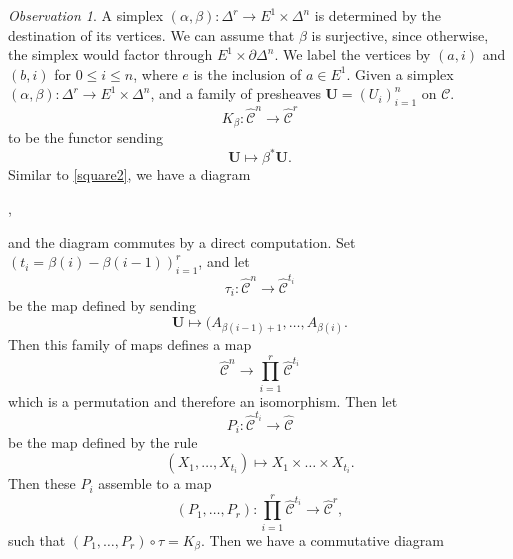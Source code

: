 \documentclass[leqno]{article}
\numberwithin{equation}{subsection}
\theoremstyle{plain}   %
\theoremstyle{remark}
\newtheorem{obs}[equation]{Observation}
\theoremstyle{plain}
\DeclareMathOperator{\id}{id}
\newcommand{\overcat}[2]{{\left(#1\downarrow #2\right)}}
\newcommand{\psh}[1]{\ensuremath{\widehat{#1}}}
\renewcommand{\C}{\ensuremath{\mathcal{C}}}
\newcommand{\ssetlab}{\ensuremath{\widehat{\Delta} \int \widehat{\mathcal{C}}}}
\begin{document}
\begin{obs}\label{joyalsquare2}
	A simplex \((\alpha,\beta):\Delta^r \to E^1\times \Delta^n\) is determined by the destination of its vertices. We can assume that \(\beta\) is surjective, since otherwise, the simplex would factor through \(E^1\times \partial \Delta^n\).     We label the vertices by \((a,i)\) and \((b,i)\) for \(0\leq i \leq n\), where \(e\) is the inclusion of \(a \in E^1\).  Given a simplex \((\alpha,\beta):\Delta^r\to E^1\times \Delta^n\), and a family of presheaves \(\mathbf{U}=(U_i)_{i=1}^n\) on \(\C\). 
	\[K_{\beta}:\psh{\C}^n \to \psh{\C}^r\]
	to be the functor sending
	\[\mathbf{U} \mapsto \beta^\ast \mathbf{U}.\]
	Similar to \ref{square2}, we have a diagram
	\begin{center}
		,
	\end{center}
	and the diagram commutes by a direct computation.  
	Set \((t_i=\beta(i) - \beta(i-1))_{i=1}^r\), and let 
	\[\tau_i:\psh{\C}^n \to \psh{\C}^{t_i}\]
	be the map defined by sending 
	\[\mathbf{U}\mapsto (A_{\beta(i-1)+1},\dots,A_{\beta(i)}.\]
	Then this family of maps defines a map 
	\[\psh{\C}^n \to \prod_{i=1}^r\psh{\C}^{t_i}\]
	which is a permutation and therefore an isomorphism. Then let
	\[P_i:\psh{\C}^{t_i} \to \psh{\C}\]
	be the map defined by the rule 
	\[(X_1,\dots,X_{t_i})\mapsto X_1\times \dots \times X_{t_i}.\]
	Then these \(P_i\) assemble to a map 
	\[(P_1,\dots,P_r): \prod_{i=1}^r \psh{\C}^{t_i} \to \psh{\C}^r,\]
	such that \((P_1,\dots,P_r)\circ \tau = K_\beta\).
	Then we have a commutative diagram
	\begin{center}
\end{center}
\end{obs}
\end{document}

